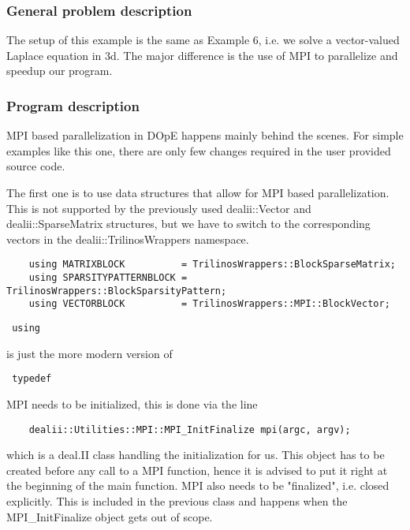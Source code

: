 \subsubsection{General problem description}
The setup of this example is the same as Example 6, i.e. we solve a vector-valued Laplace equation in 3d. The major difference is the use of MPI to parallelize and speedup our program.

\subsubsection{Program description}
MPI based parallelization in DOpE happens mainly behind the scenes. For simple examples like this one, there are only few changes required in the user provided source code.

The first one is to use data structures that allow for MPI based parallelization. This is not supported by the previously used dealii::Vector and dealii::SparseMatrix structures, but we have to switch to the corresponding vectors in the dealii::TrilinosWrappers namespace.

\begin{verbatim}
	using MATRIXBLOCK          = TrilinosWrappers::BlockSparseMatrix;
	using SPARSITYPATTERNBLOCK = TrilinosWrappers::BlockSparsityPattern;
	using VECTORBLOCK          = TrilinosWrappers::MPI::BlockVector;
\end{verbatim}

\begin{remark}
	\begin{verbatim} using \end{verbatim} is just the more modern version of \begin{verbatim} typedef \end{verbatim}
\end{remark}

MPI needs to be initialized, this is done via the line 
\begin{verbatim}
	dealii::Utilities::MPI::MPI_InitFinalize mpi(argc, argv);
\end{verbatim}
which is a deal.II class handling the initialization for us. This object has to be created before any call to a MPI function, hence it is advised to put it right at the beginning of the main function. MPI also needs to be "finalized", i.e. closed explicitly. This is included in the previous class and happens when the MPI\_InitFinalize object gets out of scope.


